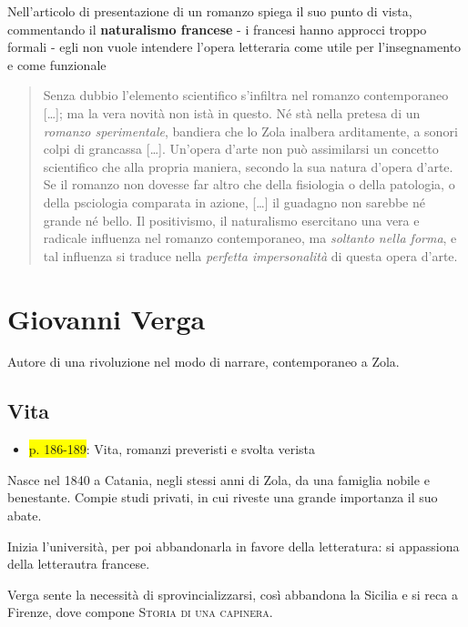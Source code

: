 \documentclass{book}
\newcommand{\pagine}[1]{\colorbox{yellow}{#1}}
\begin{document}
Nell'articolo di presentazione di un romanzo spiega il suo punto di
vista, commentando il \textbf{naturalismo francese} - i francesi hanno
approcci troppo formali - egli non vuole intendere l'opera letteraria
come utile per l'insegnamento e come funzionale

\begin{quote}
Senza dubbio l'elemento scientifico s'infiltra nel romanzo contemporaneo
{[}\ldots{]}; ma la vera novità non istà in questo. Né stà nella pretesa
di un \emph{romanzo sperimentale}, bandiera che lo Zola inalbera
arditamente, a sonori colpi di grancassa {[}\ldots{]}. Un'opera d'arte
non può assimilarsi un concetto scientifico che alla propria maniera,
secondo la sua natura d'opera d'arte. Se il romanzo non dovesse far
altro che della fisiologia o della patologia, o della psciologia
comparata in azione, {[}\ldots{]} il guadagno non sarebbe né grande né
bello. Il positivismo, il naturalismo esercitano una vera e radicale
influenza nel romanzo contemporaneo, ma \emph{soltanto nella forma}, e
tal influenza si traduce nella \emph{perfetta impersonalità} di questa
opera d'arte.
\end{quote}

\chapter{Giovanni Verga}

Autore di una rivoluzione nel modo di narrare, contemporaneo a Zola.

\section{Vita}

\begin{itemize}

\item
  \pagine{p. 186-189}: Vita, romanzi preveristi e svolta verista
\end{itemize}

Nasce nel 1840 a Catania, negli stessi anni di Zola, da una famiglia
nobile e benestante. Compie studi privati, in cui riveste una grande
importanza il suo abate.

Inizia l'università, per poi abbandonarla in favore della letteratura:
si appassiona della letterautra francese.

Verga sente la necessità di sprovincializzarsi, così abbandona la
Sicilia e si reca a Firenze, dove compone \textsc{Storia di una capinera}.
\end{document}
